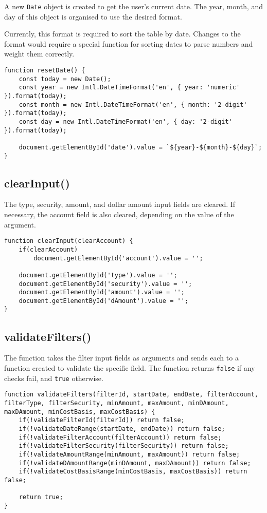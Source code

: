 \documentclass[letterpaper]{article}
\begin{document}
A new \lstinline{Date} object is created to get the user's current date.
The year, month, and day of this object is organised to use the desired format.

Currently, this format is required to sort the table by date.
Changes to the format would require a special function for sorting dates to parse numbers and weight them correctly.

\begin{lstlisting}[firstnumber=375]
function resetDate() {
    const today = new Date();
    const year = new Intl.DateTimeFormat('en', { year: 'numeric' }).format(today);
    const month = new Intl.DateTimeFormat('en', { month: '2-digit' }).format(today);
    const day = new Intl.DateTimeFormat('en', { day: '2-digit' }).format(today);

    document.getElementById('date').value = `${year}-${month}-${day}`;
}
\end{lstlisting}

\subsection{clearInput()}

The type, security, amount, and dollar amount input fields are cleared.
If necessary, the account field is also cleared, depending on the value of the argument.

\begin{lstlisting}[firstnumber=384]
function clearInput(clearAccount) {
    if(clearAccount)
        document.getElementById('account').value = '';

    document.getElementById('type').value = '';
    document.getElementById('security').value = '';
    document.getElementById('amount').value = '';
    document.getElementById('dAmount').value = '';
}
\end{lstlisting}

\subsection{validateFilters()}

The function takes the filter input fields as arguments and sends each to a function created to validate the specific field.
The function returns \lstinline{false} if any checks fail, and \lstinline{true} otherwise.

\begin{lstlisting}[firstnumber=394]
function validateFilters(filterId, startDate, endDate, filterAccount, filterType, filterSecurity, minAmount, maxAmount, minDAmount, maxDAmount, minCostBasis, maxCostBasis) {
    if(!validateFilterId(filterId)) return false;
    if(!validateDateRange(startDate, endDate)) return false;
    if(!validateFilterAccount(filterAccount)) return false;
    if(!validateFilterSecurity(filterSecurity)) return false;
    if(!validateAmountRange(minAmount, maxAmount)) return false;
    if(!validateDAmountRange(minDAmount, maxDAmount)) return false;
    if(!validateCostBasisRange(minCostBasis, maxCostBasis)) return false;

    return true;
}
\end{lstlisting}
\end{document}
